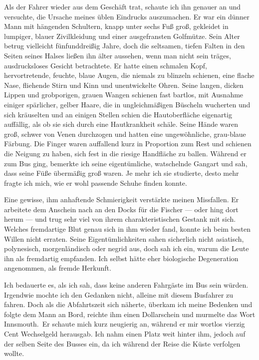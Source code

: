 Als der Fahrer wieder aus dem Geschäft trat, schaute ich ihn genauer an und versuchte, die Ursache meines üblen Eindrucks auszumachen. Er war ein dünner Mann mit hängenden Schultern, knapp unter sechs Fuß groß, gekleidet in lumpiger, blauer Zivilkleidung und einer ausgefransten Golfmütze. Sein Alter betrug vielleicht fünfunddreißig Jahre, doch die seltsamen, tiefen Falten in den Seiten seines Halses ließen ihn älter aussehen, wenn man nicht sein träges, ausdrucksloses Gesicht betrachtete. Er hatte einen schmalen Kopf, hervortretende, feuchte, blaue Augen, die niemals zu blinzeln schienen, eine flache Nase, fliehende Stirn und Kinn und unentwickelte Ohren. Seine langen, dicken Lippen und grobporigen, grauen Wangen schienen fast bartlos, mit Ausnahme einiger spärlicher, gelber Haare, die in ungleichmäßigen Büscheln wucherten und sich kräuselten und an einigen Stellen schien die Hautoberfläche eigenartig auffällig, als ob sie sich durch eine Hautkrankheit schäle. Seine Hände waren groß, schwer von Venen durchzogen und hatten eine ungewöhnliche, grau-blaue Färbung. Die Finger waren auffallend kurz in Proportion zum Rest und schienen die Neigung zu haben, sich fest in die riesige Handfläche zu ballen. Während er zum Bus ging, bemerkte ich seine eigentümliche, watschelnde Gangart und sah, dass seine Füße übermäßig groß waren. Je mehr ich sie studierte, desto mehr fragte ich mich, wie er wohl passende Schuhe finden konnte.

Eine gewisse, ihm anhaftende Schmierigkeit verstärkte meinen Missfallen. Er arbeitete dem Anschein nach an den Docks für die Fischer --- oder hing dort herum --- und trug sehr viel von ihrem charakteristischen Gestank mit sich. Welches fremdartige Blut genau sich in ihm wieder fand, konnte ich beim besten Willen nicht erraten. Seine Eigentümlichkeiten sahen sicherlich nicht asiatisch, polynesisch, morgenländisch oder negrid aus, doch sah ich ein, warum die Leute ihn als fremdartig empfanden. Ich selbst hätte eher biologische Degeneration angenommen, als fremde Herkunft.

Ich bedauerte es, als ich sah, dass keine anderen Fahrgäste im Bus sein würden. Irgendwie mochte ich den Gedanken nicht, alleine mit diesem Busfahrer zu fahren. Doch als die Abfahrtszeit sich näherte, überkam ich meine Bedenken und folgte dem Mann an Bord, reichte ihm einen Dollarschein und murmelte das Wort \glqq Innsmouth.\grqq\ Er schaute mich kurz neugierig an, während er mir wortlos vierzig Cent Wechselgeld herausgab. Ich nahm einen Platz weit hinter ihm, jedoch auf der selben Seite des Busses ein, da ich während der Reise die Küste verfolgen wollte.

